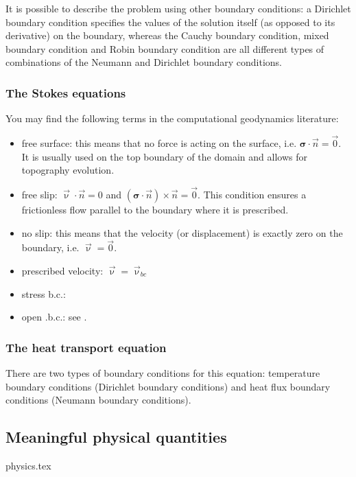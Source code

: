 It is possible to describe the problem using other boundary conditions: 
a Dirichlet boundary condition specifies the values of the solution itself 
(as opposed to its derivative) on the boundary, whereas the Cauchy boundary condition, 
mixed boundary condition and Robin boundary condition are all different types of combinations 
of the Neumann and Dirichlet boundary conditions.


\subsubsection{The Stokes equations}

You may find the following terms in the computational geodynamics literature:

\begin{itemize}
\item { free surface}: this means that no force is acting on the surface, i.e. ${\bm \sigma}\cdot {\vec n}={\vec 0}$. It is usually used on the top boundary of the domain and allows for topography evolution.
\item { free slip}: ${\vec \upnu}\cdot \vec n = 0$ and $({\bm \sigma}\cdot{\vec n})\times {\vec n}={\vec 0}$. This condition ensures a frictionless flow parallel to the boundary where it is prescribed.
\item { no slip}: this means that the velocity (or displacement) is exactly zero on the boundary, i.e. ${\vec \upnu}={\vec 0}$.
\item { prescribed velocity}: ${\vec \upnu}={\vec \upnu}_{bc}$
\item stress b.c.: 
\item open .b.c.: see . 
\end{itemize}

\subsubsection{The heat transport equation}

There are two types of boundary conditions for this equation: temperature boundary conditions (Dirichlet boundary conditions) and heat flux boundary conditions (Neumann boundary conditions). 

\newpage
\subsection{Meaningful physical quantities}
\begin{flushright} {\tiny {\color{gray} physics.tex}} \end{flushright}

